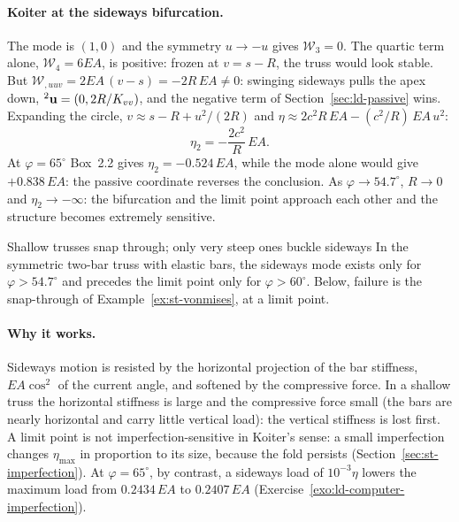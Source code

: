 \paragraph{Koiter at the sideways bifurcation.}
The mode is $(1,0)$ and the symmetry $u \to -u$ gives $\mathcal{W}_3 = 0$. The quartic
term alone, $\mathcal{W}_4 = 6EA$, is positive: frozen at $v = s - R$, the truss would
look stable. But $\mathcal{W}_{,uuv} = 2EA\,(v - s) = -2R\,EA \neq 0$: swinging sideways
pulls the apex down, ${}^2\mathbf{u} = (0, 2R/K_{vv})$, and the
negative term of Section~\ref{sec:ld-passive} wins. Expanding the circle,
$v \approx s - R + u^2/(2R)$ and $\eta \approx 2c^2R\,EA - (c^2/R)\,EA\,u^2$:
\begin{equation}\label{eq:ld-truss-eta2}
  \eta_2 = -\frac{2c^2}{R}\,EA .
\end{equation}
At $\varphi = 65^\circ$ Box~2.2 gives $\eta_2 = -0.524\,EA$, while the mode alone would give
$+0.838\,EA$: the passive coordinate reverses the conclusion. As $\varphi \to 54.7^\circ$,
$R \to 0$ and $\eta_2 \to -\infty$: the bifurcation and the limit point approach each
other and the structure becomes extremely sensitive.

\begin{gbox}{Shallow trusses snap through; only very steep ones buckle sideways}\label{sec:ld-steep}
%
In the symmetric two-bar truss with elastic bars, the sideways mode exists only for
$\varphi > 54.7^\circ$ and precedes the limit point only for $\varphi > 60^\circ$. Below,
failure is the snap-through of Example~\ref{ex:st-vonmises}, at a limit point.
\end{gbox}

\paragraph{Why it works.}
Sideways motion is resisted by the horizontal projection of the bar stiffness,
$EA\cos^2$ of the current angle, and softened by the compressive force. In a shallow
truss the horizontal stiffness is large and the compressive force small (the bars
are nearly horizontal and carry little vertical load): the vertical stiffness is lost
first. A limit point is not imperfection-sensitive in Koiter's sense: a small
imperfection changes $\eta_{\max}$ in proportion to its size, because the fold persists
(Section~\ref{sec:st-imperfection}). At $\varphi = 65^\circ$, by contrast, a sideways load
of $10^{-3}\eta$ lowers the maximum load from $0.2434\,EA$ to $0.2407\,EA$
(Exercise~\ref{exo:ld-computer-imperfection}).

